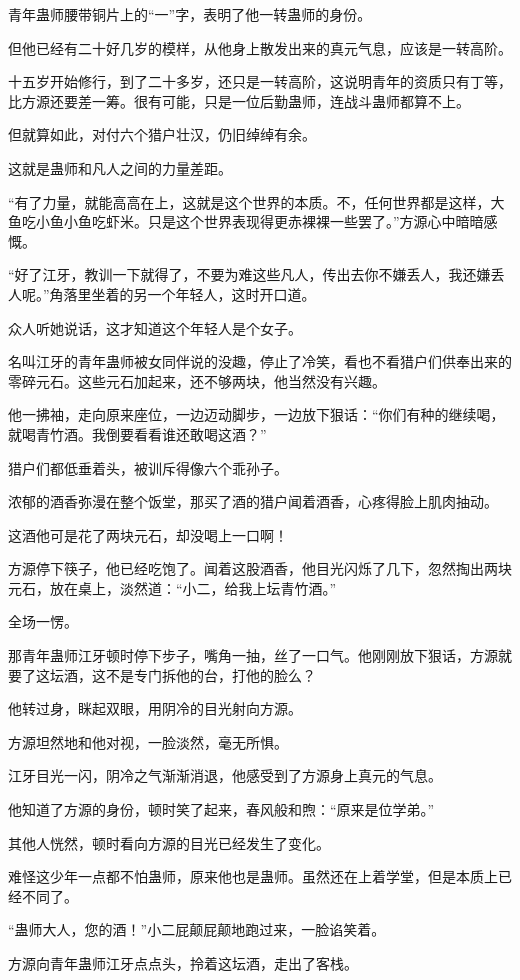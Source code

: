 \begin{this_body}
青年蛊师腰带铜片上的“一”字，表明了他一转蛊师的身份。

但他已经有二十好几岁的模样，从他身上散发出来的真元气息，应该是一转高阶。

十五岁开始修行，到了二十多岁，还只是一转高阶，这说明青年的资质只有丁等，比方源还要差一筹。很有可能，只是一位后勤蛊师，连战斗蛊师都算不上。

但就算如此，对付六个猎户壮汉，仍旧绰绰有余。

这就是蛊师和凡人之间的力量差距。

“有了力量，就能高高在上，这就是这个世界的本质。不，任何世界都是这样，大鱼吃小鱼小鱼吃虾米。只是这个世界表现得更赤裸裸一些罢了。”方源心中暗暗感慨。

“好了江牙，教训一下就得了，不要为难这些凡人，传出去你不嫌丢人，我还嫌丢人呢。”角落里坐着的另一个年轻人，这时开口道。

众人听她说话，这才知道这个年轻人是个女子。

名叫江牙的青年蛊师被女同伴说的没趣，停止了冷笑，看也不看猎户们供奉出来的零碎元石。这些元石加起来，还不够两块，他当然没有兴趣。

他一拂袖，走向原来座位，一边迈动脚步，一边放下狠话：“你们有种的继续喝，就喝青竹酒。我倒要看看谁还敢喝这酒？”

猎户们都低垂着头，被训斥得像六个乖孙子。

浓郁的酒香弥漫在整个饭堂，那买了酒的猎户闻着酒香，心疼得脸上肌肉抽动。

这酒他可是花了两块元石，却没喝上一口啊！

方源停下筷子，他已经吃饱了。闻着这股酒香，他目光闪烁了几下，忽然掏出两块元石，放在桌上，淡然道：“小二，给我上坛青竹酒。”

全场一愣。

那青年蛊师江牙顿时停下步子，嘴角一抽，丝了一口气。他刚刚放下狠话，方源就要了这坛酒，这不是专门拆他的台，打他的脸么？

他转过身，眯起双眼，用阴冷的目光射向方源。

方源坦然地和他对视，一脸淡然，毫无所惧。

江牙目光一闪，阴冷之气渐渐消退，他感受到了方源身上真元的气息。

他知道了方源的身份，顿时笑了起来，春风般和煦：“原来是位学弟。”

其他人恍然，顿时看向方源的目光已经发生了变化。

难怪这少年一点都不怕蛊师，原来他也是蛊师。虽然还在上着学堂，但是本质上已经不同了。

“蛊师大人，您的酒！”小二屁颠屁颠地跑过来，一脸谄笑着。

方源向青年蛊师江牙点点头，拎着这坛酒，走出了客栈。

\end{this_body}

